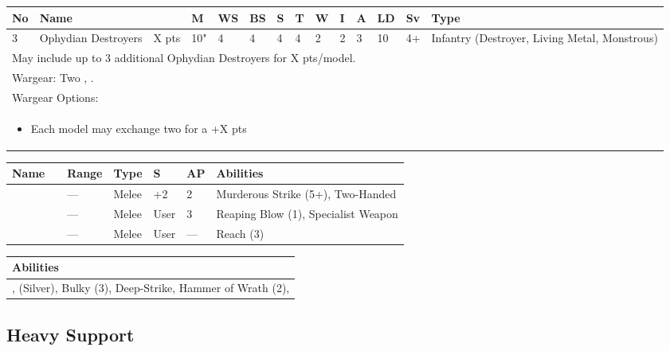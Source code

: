 \noindent
\begin{tabular}{||m{10pt} m{90pt} m{30pt} m{11pt} m{11pt} m{11pt} m{11pt} m{11pt} m{11pt} m{11pt} m{11pt} m{11pt} m{11pt} m{135pt}||}
	\hline
	No & Name & & M & WS & BS & S & T & W & I & A & LD & Sv & Type \\
	\hline
	3 & Ophydian Destroyers & X pts & 10" & 4 & 4 & 4 & 4 & 2 & 2 & 3 & 10 & 4+ & Infantry (Destroyer, Living Metal, Monstrous) \\
	\hline
	\hline
	\multicolumn{14}{||Z{532 pt}||}{May include up to 3 additional Ophydian Destroyers for X pts/model.}\\	
	\hline
	\hline
	\multicolumn{14}{||Z{532 pt}||}{Wargear: Two \quickref{Hyperphase Thresher}, \quickref{Whip Coils}.} \\
	\multicolumn{14}{||Z{532 pt}||}{Wargear Options:} \\	\multicolumn{14}{||Z{532 pt}||}{\begin{itemize}
			\item Each model may exchange two \quickref{Hyperphase Thresher} for a \quickref{Hyperphase Reap-Blade} \hrulefill +X pts
	\end{itemize}} \\
	\hline
\end{tabular}

\noindent
\begin{tabular}{||m{110pt} m{30pt} m{31pt} m{55pt} m{12pt} m{12pt} m{210pt}||}
	\hline
	Name & & Range & Type & S & AP & Abilities \\
	\hline
	\quickref{Hyperphase Reap-Blade} &  & — & Melee & +2 & 2 & Murderous Strike (5+), Two-Handed \\
	\quickref{Hyperphase Thresher} &  & — & Melee & User & 3 & Reaping Blow (1), Specialist Weapon \\
	\quickref{Whip Coils} & & — & Melee & User & — & Reach (3) \\
	\hline
\end{tabular}

\noindent
\begin{tabular}{||m{532pt}||}
	\hline
	Abilities \\
	\hline
	\quickref{Annihilation Protocols}, \quickref{Awakening Protocols} (Silver), Bulky (3), Deep-Strike, Hammer of Wrath (2), \quickref{Reanimation Protocols} \\
	\hline
\end{tabular}



\newpage
\subsection{Heavy Support}

